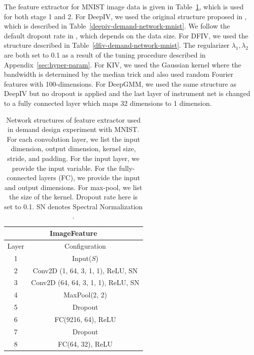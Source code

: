 The feature extractor for MNIST image data is given in Table~\ref{demand-mnist-feature}, which is used for both stage 1 and 2. For DeepIV, we used the original structure proposed in \citet{Hartford2017}, which is described in Table~\ref{deepiv-demand-network-mnist}. We follow the default dropout rate in \citet{Hartford2017}, which depends on the data size. For DFIV, we used the structure described in Table~\ref{dfiv-demand-network-mnist}. The regularizer $\lambda_1, \lambda_2$ are both set to 0.1 as a result of the tuning procedure described in Appendix~\ref{sec:hyper-param}. For KIV, we used the Gaussian kernel where the bandwidth is determined by the median trick and also used random Fourier features with 100-dimensions. For DeepGMM, we used the same structure as DeepIV but no dropout is applied and the last layer of instrument net is changed to a fully connected layer which maps 32 dimensions to 1 dimension.

\begingroup
\renewcommand{\arraystretch}{1.2}
\begin{table}[t]
    \caption{Network structures of feature extractor used in demand design experiment with MNIST. For each convolution
    layer, we list the input dimension, output dimension, kernel size, stride, and padding. For the input layer, we provide the input variable. For the fully-connected layers (FC), we provide the input and output dimensions. For max-pool, we list the size of the kernel. Dropout rate here is set to 0.1. SN denotes Spectral Normalization \citep{Miyato2018}.}
    
    \label{demand-mnist-feature}
    \centering
    \begin{minipage}{0.8\hsize}
        \centering
        \begin{tabular}{cc}
            \multicolumn{2}{c}{\bf ImageFeature} 
            \\ \hline
            Layer & Configuration \\ \hline
            1 & Input($S$) \\ \hline
            2 & Conv2D (1, 64, 3, 1, 1), ReLU, SN \\ \hline
            3 & Conv2D (64, 64, 3, 1, 1), ReLU, SN \\ \hline
            4 & MaxPool(2, 2) \\ \hline
            5 & Dropout \\ \hline
            6 & FC(9216, 64), ReLU \\ \hline
            7 & Dropout \\ \hline
            8 & FC(64, 32), ReLU \\ \hline
            \end{tabular}    
    \end{minipage}
\end{table}
\endgroup  


